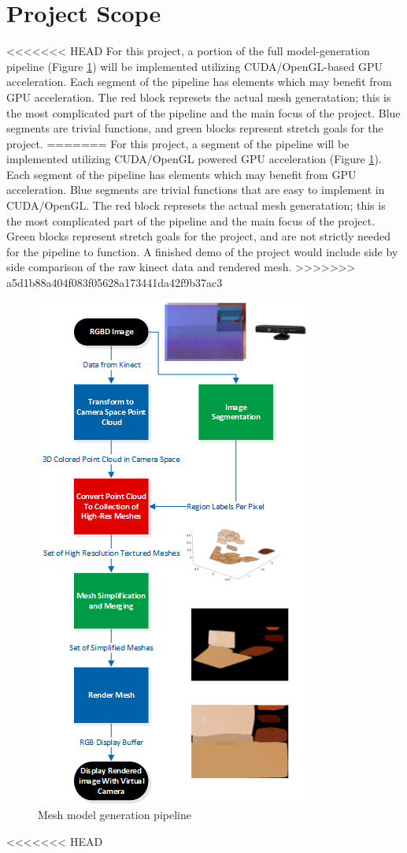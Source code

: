 \documentclass[letterpaper, 10 pt, conference]{ieeeconf}
\begin{document}
\section{Project Scope}
<<<<<<< HEAD
For this project, a portion of the full model-generation pipeline (Figure \ref{fig:pipeline}) will be implemented utilizing CUDA/OpenGL-based GPU acceleration.  Each segment of the pipeline has elements which may benefit from GPU acceleration. The red block represets the actual mesh generatation; this is the most complicated part of the pipeline and the main focus of the project. Blue segments are trivial functions, and green blocks represent stretch goals for the project.
=======
For this project, a segment of the pipeline will be implemented utilizing CUDA/OpenGL powered GPU acceleration (Figure \ref{fig:pipeline}).  Each segment of the pipeline has elements which may benefit from GPU acceleration. Blue segments are trivial functions that are easy to implement in CUDA/OpenGL. The red block represets the actual mesh generatation; this is the most complicated part of the pipeline and the main focus of the project. Green blocks represent stretch goals for the project, and are not strictly needed for the pipeline to function. A finished demo of the project would include side by side comparison of the raw kinect data and rendered mesh.
>>>>>>> a5d1b88a404f083f05628a173441da42f9b37ac3

\begin{figure}[!ht]
    \centering
    \includegraphics[scale=1.0]{pipelineflowchart.png}
    \caption{Mesh model generation pipeline}
    \label{fig:pipeline}
\end{figure}

<<<<<<< HEAD
\printbibliography
\end{document}
